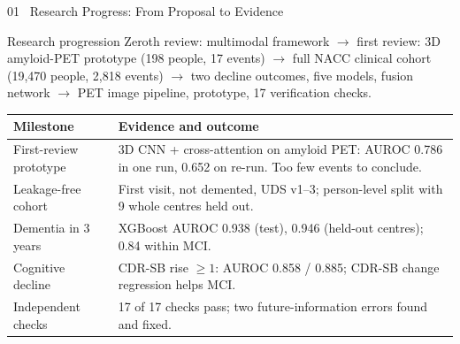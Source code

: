 \documentclass[aspectratio=169,11pt]{beamer}
\begin{document}
\begin{frame}{01 \textbar\ Research Progress: From Proposal to Evidence}
\begin{block}{Research progression}
Zeroth review: multimodal framework $\rightarrow$ first review: 3D amyloid-PET prototype (198 people, 17 events) $\rightarrow$ full NACC clinical cohort (19,470 people, 2,818 events) $\rightarrow$ two decline outcomes, five models, fusion network $\rightarrow$ PET image pipeline, prototype, 17 verification checks.
\end{block}
\footnotesize
\begin{tabularx}{\textwidth}{@{}lY@{}}
\toprule
\textbf{Milestone} & \textbf{Evidence and outcome} \\
\midrule
First-review prototype & 3D CNN + cross-attention on amyloid PET: AUROC 0.786 in one run, 0.652 on re-run. Too few events to conclude. \\
Leakage-free cohort & First visit, not demented, UDS v1--3; person-level split with 9 whole centres held out. \\
Dementia in 3 years & XGBoost AUROC 0.938 (test), 0.946 (held-out centres); 0.84 within MCI. \\
Cognitive decline & CDR-SB rise $\geq 1$: AUROC 0.858 / 0.885; CDR-SB change regression helps MCI. \\
Independent checks & 17 of 17 checks pass; two future-information errors found and fixed. \\
\bottomrule
\end{tabularx}
\end{frame}
\end{document}
